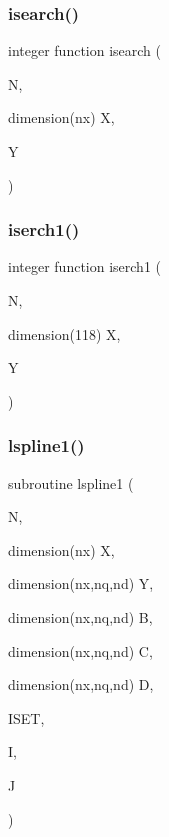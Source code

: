 \mbox{\label{polpdf_8f_a0120bfb26b8b3f5c47eea5ad05daddcb}} 
\subsubsection{\texorpdfstring{isearch()}{isearch()}}
{\footnotesize\ttfamily integer function isearch (\begin{DoxyParamCaption}\item[{}]{N,  }\item[{dimension(nx)}]{X,  }\item[{}]{Y }\end{DoxyParamCaption})}

\mbox{\label{polpdf_8f_a5094e398279bf345f2c4628fcb666b9f}} 
\subsubsection{\texorpdfstring{iserch1()}{iserch1()}}
{\footnotesize\ttfamily integer function iserch1 (\begin{DoxyParamCaption}\item[{}]{N,  }\item[{dimension(118)}]{X,  }\item[{}]{Y }\end{DoxyParamCaption})}

\mbox{\label{polpdf_8f_ac48cf37e34263c0e1d5ba2793fbccfc3}} 
\subsubsection{\texorpdfstring{lspline1()}{lspline1()}}
{\footnotesize\ttfamily subroutine lspline1 (\begin{DoxyParamCaption}\item[{}]{N,  }\item[{dimension(nx)}]{X,  }\item[{dimension(nx,nq,nd)}]{Y,  }\item[{dimension(nx,nq,nd)}]{B,  }\item[{dimension(nx,nq,nd)}]{C,  }\item[{dimension(nx,nq,nd)}]{D,  }\item[{}]{I\+S\+ET,  }\item[{}]{I,  }\item[{}]{J }\end{DoxyParamCaption})}

